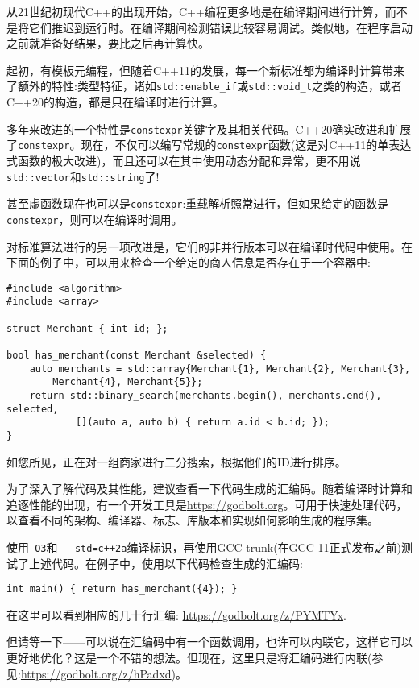 
从21世纪初现代C++的出现开始，C++编程更多地是在编译期间进行计算，而不是将它们推迟到运行时。在编译期间检测错误比较容易调试。类似地，在程序启动之前就准备好结果，要比之后再计算快。

起初，有模板元编程，但随着C++11的发展，每一个新标准都为编译时计算带来了额外的特性:类型特征，诸如\texttt{std::enable\_if}或\texttt{std::void\_t}之类的构造，或者C++20的构造，都是只在编译时进行计算。

多年来改进的一个特性是\texttt{constexpr}关键字及其相关代码。C++20确实改进和扩展了\texttt{constexpr}。现在，不仅可以编写常规的\texttt{constexpr}函数(这是对C++11的单表达式函数的极大改进)，而且还可以在其中使用动态分配和异常，更不用说\texttt{std::vector}和\texttt{std::string}了!

甚至虚函数现在也可以是\texttt{constexpr}:重载解析照常进行，但如果给定的函数是\texttt{constexpr}，则可以在编译时调用。

对标准算法进行的另一项改进是，它们的非并行版本可以在编译时代码中使用。在下面的例子中，可以用来检查一个给定的商人信息是否存在于一个容器中:

\begin{lstlisting}[style=styleCXX]
#include <algorithm>
#include <array>

struct Merchant { int id; };

bool has_merchant(const Merchant &selected) {
	auto merchants = std::array{Merchant{1}, Merchant{2}, Merchant{3},
		Merchant{4}, Merchant{5}};
	return std::binary_search(merchants.begin(), merchants.end(), selected,
			[](auto a, auto b) { return a.id < b.id; });
}
\end{lstlisting}

如您所见，正在对一组商家进行二分搜索，根据他们的ID进行排序。

为了深入了解代码及其性能，建议查看一下代码生成的汇编码。随着编译时计算和追逐性能的出现，有一个开发工具是\url{https://godbolt.org}。可用于快速处理代码，以查看不同的架构、编译器、标志、库版本和实现如何影响生成的程序集。

使用\texttt{-O3}和\texttt{-\,-std=c++2a}编译标识，再使用GCC trunk(在GCC 11正式发布之前)测试了上述代码。在例子中，使用以下代码检查生成的汇编码:

\begin{lstlisting}[style=styleCXX]
int main() { return has_merchant({4}); }
\end{lstlisting}

在这里可以看到相应的几十行汇编: \url{https://godbolt.org/z/PYMTYx}.

但请等一下——可以说在汇编码中有一个函数调用，也许可以内联它，这样它可以更好地优化？这是一个不错的想法。但现在，这里只是将汇编码进行内联(参见:\url{https://godbolt.org/z/hPadxd})。

